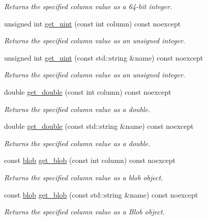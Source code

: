 \begin{DoxyCompactItemize}
\begin{DoxyCompactList}\small\item\em Returns the specified column value as a 64-\/bit integer. \end{DoxyCompactList}\item 
unsigned int \hyperlink{a00010_a02e09a2778e2f4d146ef02cd6c9e86df}{get\-\_\-uint} (const int column) const noexcept
\begin{DoxyCompactList}\small\item\em Returns the specified column value as an unsigned integer. \end{DoxyCompactList}\item 
unsigned int \hyperlink{a00010_a662bad64308f5995cb03a0ccb772acdc}{get\-\_\-uint} (const std\-::string \&name) const noexcept
\begin{DoxyCompactList}\small\item\em Returns the specified column value as an unsigned integer. \end{DoxyCompactList}\item 
double \hyperlink{a00010_aa4052f3e593580c81ba2b8622e2652eb}{get\-\_\-double} (const int column) const noexcept
\begin{DoxyCompactList}\small\item\em Returns the specified column value as a double. \end{DoxyCompactList}\item 
double \hyperlink{a00010_a0613aae6ee73cd54d7f7d0d711494737}{get\-\_\-double} (const std\-::string \&name) const noexcept
\begin{DoxyCompactList}\small\item\em Returns the specified column value as a double. \end{DoxyCompactList}\item 
const \hyperlink{a00002}{blob} \hyperlink{a00010_abd1b75c884158222778d2d6ec8b9ec18}{get\-\_\-blob} (const int column) const noexcept
\begin{DoxyCompactList}\small\item\em Returns the specified column value as a blob object. \end{DoxyCompactList}\item 
const \hyperlink{a00002}{blob} \hyperlink{a00010_a3a94b5c5a0d153ca7e2f0ef6719dfc9a}{get\-\_\-blob} (const std\-::string \&name) const noexcept
\begin{DoxyCompactList}\small\item\em Returns the specified column value as a Blob object. \end{DoxyCompactList}\item 

\end{DoxyCompactItemize}
